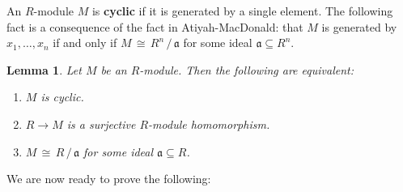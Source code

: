 \documentclass[11pt]{article}
\newtheorem{lemma}{Lemma}
\begin{document}
An $R$-module $M$ is \textbf{cyclic} if it is generated by a single element. The following fact is a consequence of the fact in Atiyah-MacDonald: that $M$ is generated by $x_{1}, \ldots, x_{n}$ if and only if $M \, \cong \, R^{n} \, / \, \mathfrak{a}$ for some ideal $\mathfrak{a} \subseteq R^{n}$.

\begin{adjustwidth}{0.5cm}{}
  \begin{lemma}
    Let $M$ be an $R$-module. Then the following are equivalent:
    \begin{enumerate}
      \item $M$ is cyclic.
      \item $R \to M$ is a surjective $R$-module homomorphism.
      \item $M \, \cong \, R \, / \, \mathfrak{a}$ for some ideal $\mathfrak{a} \subseteq R$.
    \end{enumerate}
  \end{lemma}
\end{adjustwidth}

We are now ready to prove the following:
\end{document}
